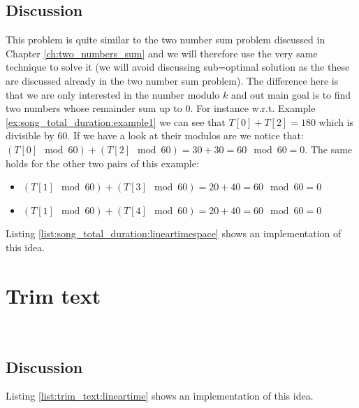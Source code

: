 \subsection{Discussion}
This problem is quite similar to the two number sum problem discussed in Chapter \ref{ch:two_numbers_sum} and we will therefore use the very same technique to solve it (we will avoid discussing sub=optimal solution as the these are discussed already in the two number sum problem).
The difference here is that we are only interested in the number modulo $k$ and out main goal is to find two numbers whose remainder sum up to $0$.
For instance w.r.t. Example \ref{ex:song_total_duration:example1} we can see that  $T[0]+T[2] = 180$ which is divisible by $60$. 
If we have a look at their modulos are we notice that: $(T[0] \mod{60}) +(T[2] \mod{60}) = 30+30 = 60 \mod{60} =0$.
The same holds for the other two pairs of this example:
\begin{itemize}
    \item $(T[1] \mod{60}) +(T[3] \mod{60}) = 20+40 = 60 \mod{60} =0$
    \item $(T[1] \mod{60}) +(T[4] \mod{60}) = 20+40 = 60 \mod{60} =0$
\end{itemize}


Listing \ref{list:song_total_duration:lineartimespace} shows an implementation of this idea.





\section{Trim text}
\begin{exercise}
    
     
    \begin{example}
        \label{ex:trim_text:example1}
        \hfill \\
       
    \end{example}
    
    \end{exercise}
 

\subsection{Discussion}

Listing \ref{list:trim_text:lineartime} shows an implementation of this idea.




